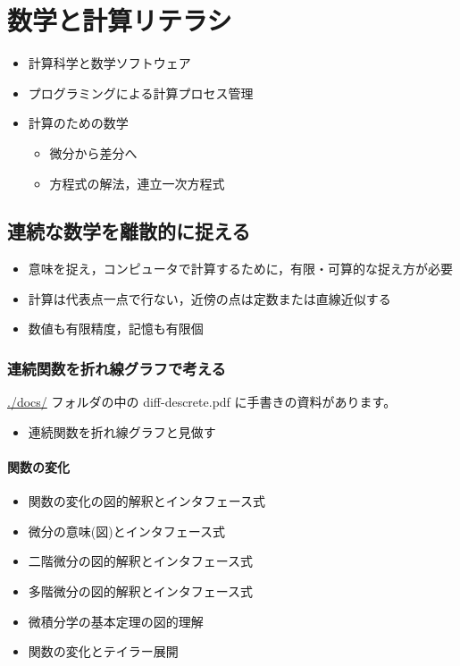 \documentclass[dvipdfmx,11pat]{jarticle}
\begin{document}
\section{数学と計算リテラシ}
\label{sec:orgee7ed5b}
\begin{itemize}
\item 計算科学と数学ソフトウェア
\item プログラミングによる計算プロセス管理
\item 計算のための数学
\begin{itemize}
\item 微分から差分へ
\item 方程式の解法，連立一次方程式
\end{itemize}
\end{itemize}
\subsection{連続な数学を離散的に捉える}
\label{sec:org3174261}
\begin{itemize}
\item 意味を捉え，コンピュータで計算するために，有限・可算的な捉え方が必要
\item 計算は代表点一点で行ない，近傍の点は定数または直線近似する
\item 数値も有限精度，記憶も有限個
\end{itemize}
\subsubsection{連続関数を折れ線グラフで考える}
\label{sec:org6e9b052}

\url{./docs/} フォルダの中の diff-descrete.pdf に手書きの資料があります。
\begin{itemize}
\item 連続関数を折れ線グラフと見做す
\end{itemize}
\paragraph{関数の変化}
\label{sec:org8ab1964}
\begin{itemize}
\item 関数の変化の図的解釈とインタフェース式

\item 微分の意味(図)とインタフェース式

\item 二階微分の図的解釈とインタフェース式

\item 多階微分の図的解釈とインタフェース式

\item 微積分学の基本定理の図的理解

\item 関数の変化とテイラー展開
\end{itemize}
\end{document}
